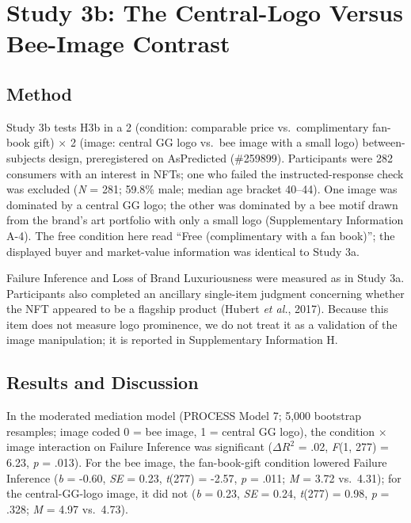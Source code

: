 \documentclass[12pt, a4paper]{article}
\begin{document}
\section{Study 3b: The Central-Logo Versus Bee-Image Contrast}

\subsection{Method}

Study 3b tests H3b in a 2 (condition: comparable price vs.\ complimentary fan-book gift) $\times$ 2 (image: central GG logo vs.\ bee image with a small logo) between-subjects design, preregistered on AsPredicted (\#259899). Participants were 282 consumers with an interest in NFTs; one who failed the instructed-response check was excluded (\emph{N} = 281; 59.8\% male; median age bracket 40--44). One image was dominated by a central GG logo; the other was dominated by a bee motif drawn from the brand's art portfolio with only a small logo (Supplementary Information A-4). The free condition here read ``Free (complimentary with a fan book)''; the displayed buyer and market-value information was identical to Study 3a.

Failure Inference and Loss of Brand Luxuriousness were measured as in Study 3a. Participants also completed an ancillary single-item judgment concerning whether the NFT appeared to be a flagship product (Hubert \emph{et al.}, 2017). Because this item does not measure logo prominence, we do not treat it as a validation of the image manipulation; it is reported in Supplementary Information H.

\subsection{Results and Discussion}

In the moderated mediation model (PROCESS Model 7; 5,000 bootstrap resamples; image coded 0 = bee image, 1 = central GG logo), the condition $\times$ image interaction on Failure Inference was significant ($\Delta R^2$ = .02, \emph{F}(1, 277) = 6.23, \emph{p} = .013). For the bee image, the fan-book-gift condition lowered Failure Inference (\emph{b} = -0.60, \emph{SE} = 0.23, \emph{t}(277) = -2.57, \emph{p} = .011; \emph{M} = 3.72 vs.\ 4.31); for the central-GG-logo image, it did not (\emph{b} = 0.23, \emph{SE} = 0.24, \emph{t}(277) = 0.98, \emph{p} = .328; \emph{M} = 4.97 vs.\ 4.73).
\end{document}
